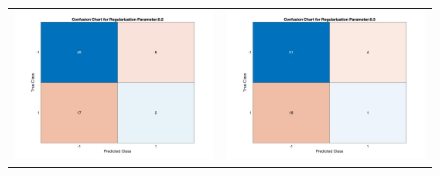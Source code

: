 \documentclass[11pt]{article}
\begin{document}
\begin{figure}[H]
\begin{adjustbox}{width=0.8\paperwidth}
\begin{tabular}{c c}
			\includegraphics{Codes/Results/L1 Logistic Train/Conf_Chart_Reg_Par_0.2} & \includegraphics{Codes/Results/L1 Logistic Train/Conf_Chart_Reg_Par_0.3}\\

\end{tabular}
\end{adjustbox}
\end{figure}
\end{document}
